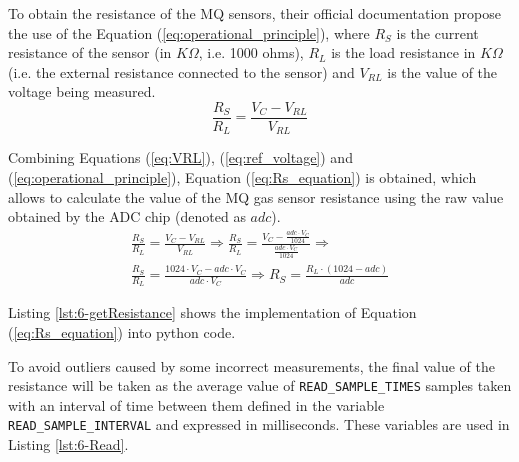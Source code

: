 To obtain the resistance of the MQ sensors, their official documentation \cite{MQ2, MQ7} propose the use of the Equation (\ref{eq:operational_principle}), where ${R}_{S}$ is the current resistance of the sensor (in $K\Omega$, i.e. 1000 ohms), ${R}_{L}$ is the load resistance in $K\Omega$ (i.e. the external resistance connected to the sensor) and ${V}_{RL}$ is the value of the voltage being measured. 
\begin{equation} \label{eq:operational_principle}
\frac { { R }_{ S } }{ { R }_{ L } }=\frac { { V }_{ C }-V_{ RL } }{ V_{ RL } } 
\end{equation}

Combining Equations (\ref{eq:VRL}), (\ref{eq:ref_voltage}) and (\ref{eq:operational_principle}), Equation (\ref{eq:Rs_equation}) is obtained, which allows to calculate the value of the MQ gas sensor resistance using the raw value obtained by the \ac{ADC} chip (denoted as $adc$). \clearpage
\begin{equation} \label{eq:Rs_equation}
\begin{aligned}
\frac { { R }_{ S } }{ { R }_{ L } }=\frac { { V }_{ C }-V_{ RL } }{ V_{ RL } } \Rightarrow 
\frac { { R }_{ S } }{ { R }_{ L } }=\frac { { V }_{ C }-\frac { adc\cdot { V }_{ C } }{ 1024 }  }{ \frac { adc\cdot { V }_{ C } }{ 1024 }  } \Rightarrow \\
\frac { { R }_{ S } }{ { R }_{ L } }=\frac { 1024\cdot { V }_{ C }-adc\cdot { V }_{ C } }{ adc\cdot { V }_{ C } } \Rightarrow 
\boxed{
{ R }_{ S }=\frac {  { R }_{ L } \cdot (1024-adc) }{ adc } 
}
\end{aligned}
\end{equation}

Listing \ref{lst:6-getResistance} shows the implementation of Equation (\ref{eq:Rs_equation}) into python code.


To avoid outliers caused by some incorrect measurements, the final value of the resistance will be taken as the average value of \texttt{READ\_SAMPLE\_TIMES} samples taken with an interval of time between them defined in the variable \texttt{READ\_SAMPLE\_INTERVAL} and expressed in milliseconds. These variables are used in Listing \ref{lst:6-Read}.

